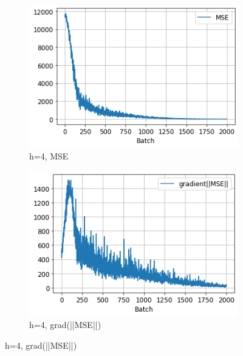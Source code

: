 \documentclass{homework}
\begin{document}
\begin{figure}[H]
\begin{subfigure}{0.4\textwidth}
\includegraphics[width=\linewidth]{h4_MSE.png}
\caption{h=4, MSE} \label{fig:a}
\end{subfigure}\hspace*{\fill}
\begin{subfigure}{0.4\textwidth}
\includegraphics[width=\linewidth]{h4_gradient.png}
\caption{h=4, grad(||MSE||)} \label{fig:b}
\end{subfigure}


\end{figure}
\end{document}
